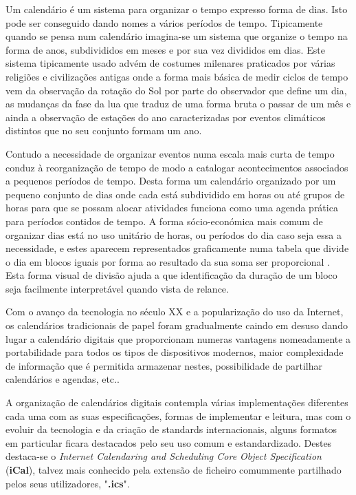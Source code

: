\documentclass[11pt, twoside]{report}
\begin{document}
	Um calendário é um sistema para organizar o tempo expresso forma de dias. 
	Isto pode ser conseguido dando nomes a vários períodos de tempo. 
	Tipicamente quando se pensa num calendário imagina-se um sistema que organize o tempo na forma de anos, subdivididos em meses e por sua vez divididos em dias. 
	Este sistema tipicamente usado advém de costumes milenares praticados por várias religiões e civilizações antigas onde a forma mais básica de medir ciclos de tempo vem da observação da rotação do Sol por parte do observador que define um dia, as mudanças da fase da lua que traduz de uma forma bruta o passar de um mês e ainda a observação de estações do ano caracterizadas por eventos climáticos distintos que no seu conjunto formam um ano\cite{stray_mayan_2007}. 
	
	Contudo a necessidade de organizar eventos numa escala mais curta de tempo conduz à reorganização de tempo de modo a catalogar acontecimentos associados a pequenos períodos de tempo. 
	Desta forma um calendário organizado por um pequeno conjunto de dias onde cada está subdividido em horas ou até grupos de horas para que se possam alocar atividades funciona como uma agenda prática para períodos contidos de tempo. 
	A forma sócio-económica mais comum de organizar dias está no uso unitário de horas, ou períodos do dia caso seja essa a necessidade, e estes aparecem representados graficamente numa tabela\cite{10.1145/2702613.2732512} que divide o dia em blocos iguais por forma ao resultado da sua soma ser proporcional \cite{Russell1910-RUSPMV}. 
	Esta forma visual de divisão ajuda a que identificação da duração de um bloco seja facilmente interpretável quando vista de relance. 
	
	Com o avanço da tecnologia no século XX e a popularização do uso da Internet, os calendários tradicionais de papel foram gradualmente caindo em desuso dando lugar a calendário digitais que proporcionam numeras vantagens nomeadamente a portabilidade para todos os tipos de dispositivos modernos, maior complexidade de informação que é permitida armazenar nestes, possibilidade de partilhar calendários e agendas, etc.. 
	
	A organização de calendários digitais contempla várias implementações diferentes cada uma com as suas especificações, formas de implementar e leitura, mas com o evoluir da tecnologia e da criação de standards internacionais, alguns formatos em particular ficara destacados pelo seu uso comum e estandardizado. 
	Destes destaca-se o \textit{Internet Calendaring and Scheduling Core Object Specification} (\textbf{iCal})\cite{rfc2445}, talvez mais conhecido pela extensão de ficheiro comummente partilhado pelos seus utilizadores, "\textbf{.ics}". 
	
\end{document}
